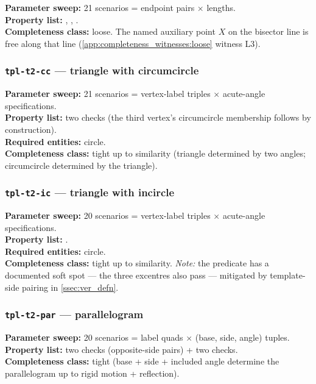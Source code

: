 \textbf{Parameter sweep:} 21 scenarios = endpoint pairs $\times$ lengths.\\
\textbf{Property list:} , , .\\
\textbf{Completeness class:} loose. The named auxiliary point $X$ on the bisector line is free along that line (\cref{app:completeness_witnesses:loose} witness L3).

\subsubsection{\texttt{tpl-t2-cc} --- triangle with circumcircle}

\textbf{Parameter sweep:} 21 scenarios = vertex-label triples $\times$ acute-angle specifications.\\
\textbf{Property list:} two  checks (the third vertex's circumcircle membership follows by construction).\\
\textbf{Required entities:} circle.\\
\textbf{Completeness class:} tight up to similarity (triangle determined by two angles; circumcircle determined by the triangle).

\subsubsection{\texttt{tpl-t2-ic} --- triangle with incircle}

\textbf{Parameter sweep:} 20 scenarios = vertex-label triples $\times$ acute-angle specifications.\\
\textbf{Property list:} .\\
\textbf{Required entities:} circle.\\
\textbf{Completeness class:} tight up to similarity. \emph{Note:} the  predicate has a documented soft spot --- the three excentres also pass --- mitigated by template-side pairing in \cref{ssec:ver_defn}.

\subsubsection{\texttt{tpl-t2-par} --- parallelogram}

\textbf{Parameter sweep:} 20 scenarios = label quads $\times$ (base, side, angle) tuples.\\
\textbf{Property list:} two  checks (opposite-side pairs) + two  checks.\\
\textbf{Completeness class:} tight (base + side + included angle determine the parallelogram up to rigid motion + reflection).

